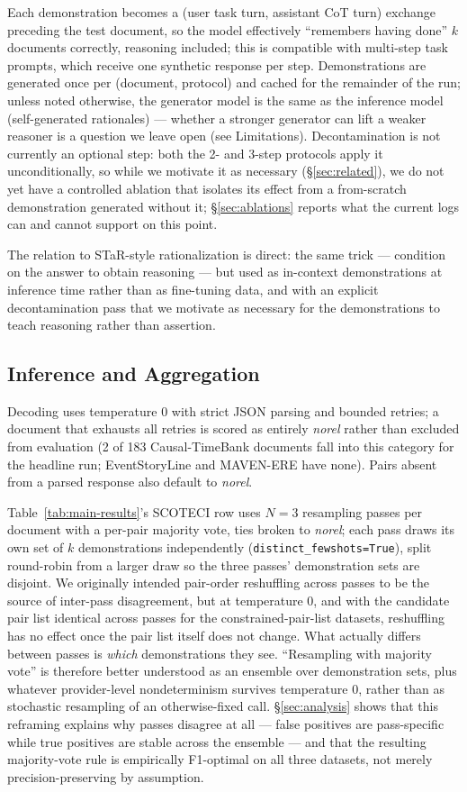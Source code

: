 \documentclass[11pt]{article}
\newcommand{\method}{SCOTECI}
\begin{document}
Each demonstration becomes a (user task turn, assistant CoT turn) exchange
preceding the test document, so the model effectively ``remembers having done'' $k$
documents correctly, reasoning included; this is compatible with multi-step task
prompts, which receive one synthetic response per step. Demonstrations are
generated once per (document, protocol) and cached for the remainder of the run;
unless noted otherwise, the generator model is the same as the inference model
(self-generated rationales) --- whether a stronger generator can lift a weaker
reasoner is a question we leave open (see Limitations). Decontamination is not
currently an optional step: both the 2- and 3-step protocols apply it
unconditionally, so while we motivate it as necessary (\S\ref{sec:related}), we do
not yet have a controlled ablation that isolates its effect from a
from-scratch demonstration generated without it; \S\ref{sec:ablations} reports
what the current logs can and cannot support on this point.

The relation to STaR-style rationalization \citep{zelikman2022star} is direct: the
same trick --- condition on the answer to obtain reasoning --- but used as
in-context demonstrations at inference time rather than as fine-tuning data, and
with an explicit decontamination pass that we motivate as necessary for the
demonstrations to teach reasoning rather than assertion.

\subsection{Inference and Aggregation}
\label{sec:inference}
Decoding uses temperature 0 with strict JSON parsing and bounded retries; a
document that exhausts all retries is scored as entirely \textit{norel} rather than
excluded from evaluation (2 of 183 Causal-TimeBank documents fall into this
category for the headline run; EventStoryLine and MAVEN-ERE have none). Pairs
absent from a parsed response also default to \textit{norel}.

Table~\ref{tab:main-results}'s \method{} row uses $N=3$ resampling passes per
document with a per-pair majority vote, ties broken to \textit{norel}; each pass
draws its own set of $k$ demonstrations independently
(\texttt{distinct\_fewshots=True}), split round-robin from a larger draw so the
three passes' demonstration sets are disjoint. We originally intended pair-order
reshuffling across passes to be the source of inter-pass disagreement, but at
temperature 0, and with the candidate pair list identical across passes for the
constrained-pair-list datasets, reshuffling has no effect once the pair list itself
does not change. What actually differs between passes is \emph{which}
demonstrations they see. ``Resampling with majority vote'' is therefore better
understood as an ensemble over demonstration sets, plus whatever provider-level
nondeterminism survives temperature 0, rather than as stochastic resampling of an
otherwise-fixed call. \S\ref{sec:analysis} shows that this reframing explains why
passes disagree at all --- false positives are pass-specific while true positives
are stable across the ensemble --- and that the resulting majority-vote rule is
empirically F1-optimal on all three datasets, not merely precision-preserving by
assumption.
\end{document}
